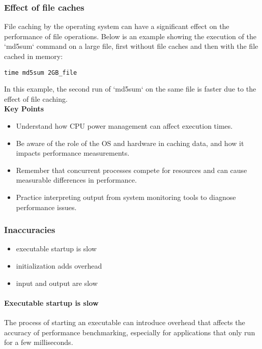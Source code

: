 \documentclass[12pt]{article}
\begin{document}
\subsubsection{Effect of file caches}
File caching by the operating system can have a significant effect on the performance of file operations. Below is an example showing the execution of the `md5sum` command on a large file, first without file caches and then with the file cached in memory:

\begin{verbatim}
time md5sum 2GB_file
\end{verbatim}

In this example, the second run of `md5sum` on the same file is faster due to the effect of file caching.\\

\textbf{Key Points}\\
\begin{itemize}
    \item Understand how CPU power management can affect execution times.
    \item Be aware of the role of the OS and hardware in caching data, and how it impacts performance measurements.
    \item Remember that concurrent processes compete for resources and can cause measurable differences in performance.
    \item Practice interpreting output from system monitoring tools to diagnose performance issues.
\end{itemize}

\subsubsection{Inaccuracies}
\begin{itemize}
    \item executable startup is slow
    \item initialization adds overhead
    \item input and output are slow
\end{itemize}

\paragraph{Executable startup is slow}
The process of starting an executable can introduce overhead that affects the accuracy of performance benchmarking, especially for applications that only run for a few milliseconds.
\end{document}
